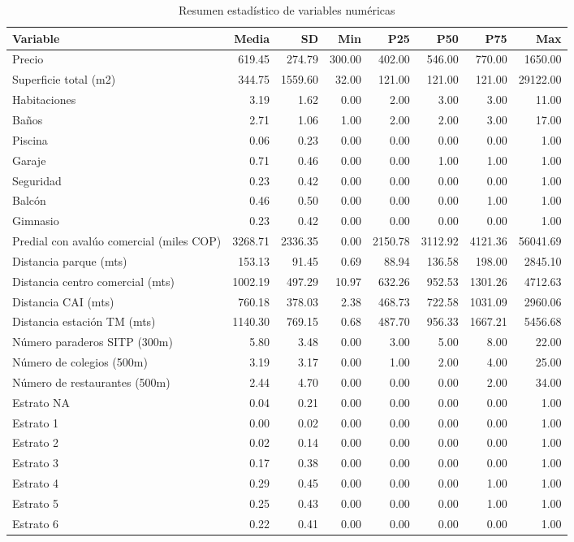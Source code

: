 \begin{table}[ht]
\centering
\begin{tabular}{lrrrrrrr}
  \hline
Variable & Media & SD & Min & P25 & P50 & P75 & Max \\ 
  \hline
Precio & 619.45 & 274.79 & 300.00 & 402.00 & 546.00 & 770.00 & 1650.00 \\ 
  Superficie total (m2) & 344.75 & 1559.60 & 32.00 & 121.00 & 121.00 & 121.00 & 29122.00 \\ 
  Habitaciones & 3.19 & 1.62 & 0.00 & 2.00 & 3.00 & 3.00 & 11.00 \\ 
  Baños & 2.71 & 1.06 & 1.00 & 2.00 & 2.00 & 3.00 & 17.00 \\ 
  Piscina & 0.06 & 0.23 & 0.00 & 0.00 & 0.00 & 0.00 & 1.00 \\ 
  Garaje & 0.71 & 0.46 & 0.00 & 0.00 & 1.00 & 1.00 & 1.00 \\ 
  Seguridad & 0.23 & 0.42 & 0.00 & 0.00 & 0.00 & 0.00 & 1.00 \\ 
  Balcón & 0.46 & 0.50 & 0.00 & 0.00 & 0.00 & 1.00 & 1.00 \\ 
  Gimnasio & 0.23 & 0.42 & 0.00 & 0.00 & 0.00 & 0.00 & 1.00 \\ 
  Predial con avalúo comercial (miles COP) & 3268.71 & 2336.35 & 0.00 & 2150.78 & 3112.92 & 4121.36 & 56041.69 \\ 
  Distancia parque (mts) & 153.13 & 91.45 & 0.69 & 88.94 & 136.58 & 198.00 & 2845.10 \\ 
  Distancia centro comercial (mts) & 1002.19 & 497.29 & 10.97 & 632.26 & 952.53 & 1301.26 & 4712.63 \\ 
  Distancia CAI (mts) & 760.18 & 378.03 & 2.38 & 468.73 & 722.58 & 1031.09 & 2960.06 \\ 
  Distancia estación TM (mts) & 1140.30 & 769.15 & 0.68 & 487.70 & 956.33 & 1667.21 & 5456.68 \\ 
  Número paraderos SITP (300m) & 5.80 & 3.48 & 0.00 & 3.00 & 5.00 & 8.00 & 22.00 \\ 
  Número de colegios (500m) & 3.19 & 3.17 & 0.00 & 1.00 & 2.00 & 4.00 & 25.00 \\ 
  Número de restaurantes (500m) & 2.44 & 4.70 & 0.00 & 0.00 & 0.00 & 2.00 & 34.00 \\ 
  Estrato NA & 0.04 & 0.21 & 0.00 & 0.00 & 0.00 & 0.00 & 1.00 \\ 
  Estrato 1 & 0.00 & 0.02 & 0.00 & 0.00 & 0.00 & 0.00 & 1.00 \\ 
  Estrato 2 & 0.02 & 0.14 & 0.00 & 0.00 & 0.00 & 0.00 & 1.00 \\ 
  Estrato 3 & 0.17 & 0.38 & 0.00 & 0.00 & 0.00 & 0.00 & 1.00 \\ 
  Estrato 4 & 0.29 & 0.45 & 0.00 & 0.00 & 0.00 & 1.00 & 1.00 \\ 
  Estrato 5 & 0.25 & 0.43 & 0.00 & 0.00 & 0.00 & 1.00 & 1.00 \\ 
  Estrato 6 & 0.22 & 0.41 & 0.00 & 0.00 & 0.00 & 0.00 & 1.00 \\ 
   \hline
\end{tabular}
\caption{Resumen estadístico de variables numéricas} 
\end{table}
